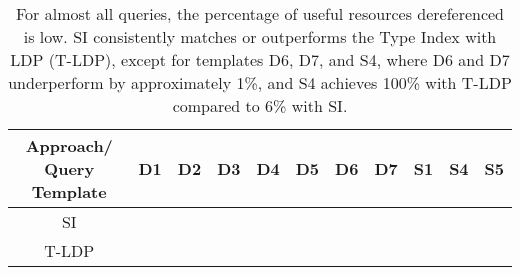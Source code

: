 \begin{table}[htbp]
	\begin{center}
		\begin{tabular}{|c|c|c|c|c|c|c|c|c|c|c|}
			\hline
            Approach/ Query Template & D1 & D2 & D3 & D4 & D5 & D6 & D7 & S1 & S4 & S5 \\
			\hline
            SI & {} & {} & {} & {} & {} & {} & {} & {} & {} & {} \\
            \hline
			T-LDP  & {} & {} & {} & {} & {} & {} & {} & {} & {} & {} \\
			\hline
		\end{tabular}
	\end{center}
	\caption{
        For almost all queries, the percentage of useful resources dereferenced is low. 
		SI consistently matches or outperforms the Type Index with LDP (T-LDP), except for templates D6, D7, and S4, where D6 and D7 underperform by approximately 1\%, and S4 achieves 100\% with T-LDP compared to 6\% with SI.
		}
	\label{tab:ratioUsefulResources}
\end{table}